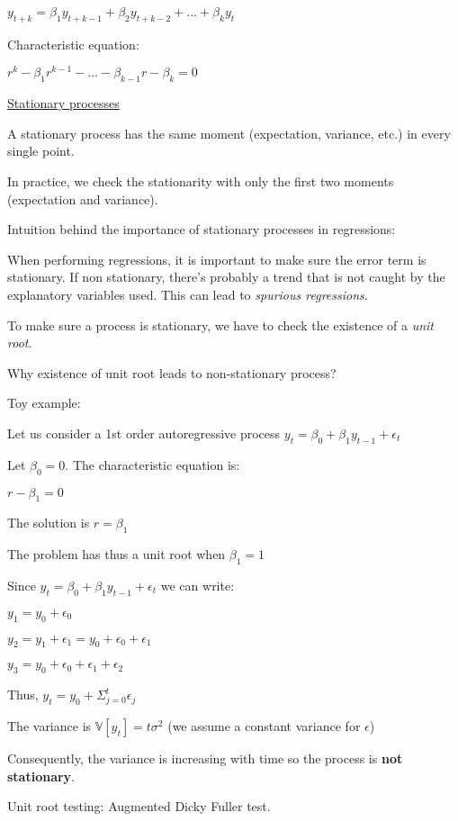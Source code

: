 $y_{t+k} = \beta_1 y_{t+k-1} + \beta_2 y_{t+k-2} + ... + \beta_k y_{t}$

\vspace{5mm}

Characteristic equation:

$r^k - \beta_1 r^{k-1} - ... - \beta_{k-1} r - \beta_k = 0$

\vspace{5mm}

\underline{Stationary processes}

\vspace{5mm}

A stationary process has the same moment (expectation, variance, etc.)  in every single point.

In practice, we check the stationarity with only the first two moments (expectation and variance).

\vspace{5mm}

Intuition behind the importance of stationary processes in regressions:

When performing regressions, it is important to make sure the error term is stationary. If non stationary, there's probably a trend that is not caught by the explanatory variables used. This can lead to \textit{spurious regressions}.

\vspace{5mm}

To make sure a process is stationary, we have to check the existence of a \textit{unit root}.

\vspace{5mm}

Why existence of unit root leads to non-stationary process?

Toy example:

Let us consider a 1st order autoregressive process $y_t = \beta_0 + \beta_1 y_{t-1} + \epsilon_t$

Let $\beta_0 = 0$. The characteristic equation is:

$r - \beta_1 = 0$

The solution is $r = \beta_1$

The problem has thus a unit root when $\beta_1 = 1$

Since $y_t = \beta_0 + \beta_1 y_{t-1} + \epsilon_t$ we can write:

$y_1 = y_0 + \epsilon_0$

$y_2 = y_1 + \epsilon_1 = y_0 + \epsilon_0 + \epsilon_1$

$y_3 = y_0 + \epsilon_0 + \epsilon_1 + \epsilon_2$

Thus, $y_t = y_0 + \Sigma_{j=0}^t \epsilon_j$

The variance is $\mathbb{V}[y_t] = t \sigma^2$ (we assume a constant variance for $\epsilon$)

Consequently, the variance is increasing with time so the process is \textbf{not stationary}.

\vspace{5mm}

Unit root testing: Augmented Dicky Fuller test.

\vspace{5mm}
